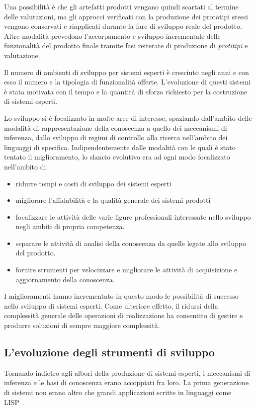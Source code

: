 Una possibilità è che gli artefatti prodotti vengano quindi scartati al termine delle valutazioni, ma gli approcci verificati con la produzione dei prototipi stessi vengono conservati e riapplicati durante la fare di sviluppo reale del prodotto. Altre modalità prevedono l'accorpamento e sviluppo incrementale delle funzionalità del prodotto finale tramite fasi reiterate di produzione di \emph{protitipi} e valutazione.

Il numero di ambienti di sviluppo per sistemi esperti è cresciuto negli anni e con esso il numero e la tipologia di funzionalità offerte.
L'evoluzione di questi sistemi è stata motivata con il tempo e la quantità di sforzo richiesto per la costruzione di sistemi esperti.

Lo sviluppo si è focalizzato in molte aree di interesse, spaziando dall'ambito delle modalità di rappresentazione della conoscenza a quello dei meccanismi di inferenza, dallo sviluppo di regimi di controllo alla ricerca nell'ambito dei linguaggi di specifica. Indipendentemente dalle modalità con le quali è stato tentato il miglioramento, lo slancio evolutivo era ad ogni modo focalizzato nell'ambito di:
\begin{itemize}
	\item ridurre tempi e costi di sviluppo dei sistemi esperti
	\item migliorare l'affidabilità e la qualità generale dei sistemi prodotti
	\item focalizzare le attività delle varie figure professionali interessate nello sviluppo negli ambiti di propria competenza.
	\item separare le attività di analisi della conoscenza da quelle legate allo sviluppo del prodotto.
	\item fornire strumenti per velocizzare e migliorare le attività di acquisizione e aggiornamento della conoscenza.
\end{itemize}

I miglioramenti hanno incrementato in questo modo le possibilità di successo nello sviluppo di sistemi esperti. Come ulteriore effetto, il ridursi della complessità generale delle operazioni di realizzazione ha consentito di gestire e produrre soluzioni di sempre maggiore complessità.

\subsection{L'evoluzione degli strumenti di sviluppo}

Tornando indietro agli albori della produzione di sistemi esperti, i meccanismi di inferenza e le basi di conoscenza erano accoppiati fra loro. La prima generazione di sistemi non erano altro che grandi applicazioni scritte in linguaggi come LISP~\cite{knowbel1993}.

